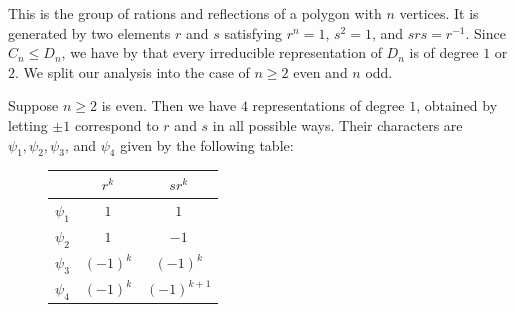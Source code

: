 \documentclass[letterpaper, 11pt, oneside]{book}
\begin{document}
\begin{ex}\label{ex:char_table_Dn}
  This is the group of rations and reflections of a polygon with $n$ vertices.
  It is generated by two elements $r$ and $s$ satisfying $r^{n} = 1$, $s^{2} = 1$, and $srs = r^{-1}$.
  Since $C_{n} \leq D_{n}$, we have by  that every irreducible representation of $D_{n}$ is of degree $1$ or $2$.
  We split our analysis into the case of $n \geq 2$ even and $n$ odd.

  Suppose $n \geq 2$ is even.
  Then we have $4$ representations of degree $1$, obtained by letting $\pm 1$ correspond to $r$ and $s$ in all possible ways.
  Their characters are $\psi_{1}, \psi_{2}, \psi_{3}$, and $\psi_{4}$ given by the following table:
  \begin{figure}[h]
    \centering
    \begin{tabular}{l|cc}
               & $r^{k}$ & $sr^{k}$ \\\hline
      $\psi_1$ & $1$ & $1$ \\
      $\psi_2$ & $1$ & $-1$ \\
      $\psi_3$ & $(-1)^{k}$ & $(-1)^{k}$ \\
      $\psi_4$ & $(-1)^{k}$ & $(-1)^{k + 1}$
    \end{tabular}
  \end{figure}

  \clearpage


\end{ex}
\end{document}
